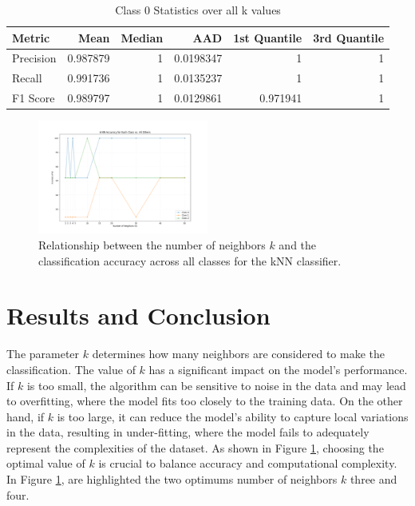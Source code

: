 \documentclass[9pt,technote]{IEEEtran}
\begin{document}
\begin{table}[h!]
    \centering
    \caption{Class 0 Statistics over all k values}
    \begin{tabular}{@{}lrrrrr@{}}
        \toprule
        Metric    & Mean     & Median   & AAD       & 1st Quantile & 3rd Quantile \\
        \midrule
        Precision & 0.987879 & 1        & 0.0198347 & 1           & 1            \\
        Recall    & 0.991736 & 1        & 0.0135237 & 1           & 1            \\
        F1 Score  & 0.989797 & 1        & 0.0129861 & 0.971941    & 1            \\
        \bottomrule
    \end{tabular}
\end{table}

\begin{figure}[h]
	\centering
	\includegraphics[width=0.5\textwidth]{accuracy.png}
	\caption{Relationship between the number of neighbors $k$ and the classification accuracy across all classes for the kNN classifier.}
	\label{fig::accuracy}
\end{figure}

\section{Results and Conclusion}
The parameter $k$ determines how many neighbors are considered to make the classification. The value of $k$ has a significant impact on the model's performance. If $k$ is too small, the algorithm can be sensitive to noise in the data and may lead to overfitting, where the model fits too closely to the training data. On the other hand, if $k$ is too large, it can reduce the model's ability to capture local variations in the data, resulting in under-fitting, where the model fails to adequately represent the complexities of the dataset. As shown in Figure \ref{fig::accuracy}, choosing the optimal value of $k$ is crucial to balance accuracy and computational complexity.
In Figure \ref{fig::accuracy}, are highlighted the two optimums number of neighbors $k$ three and four.


\end{document}
